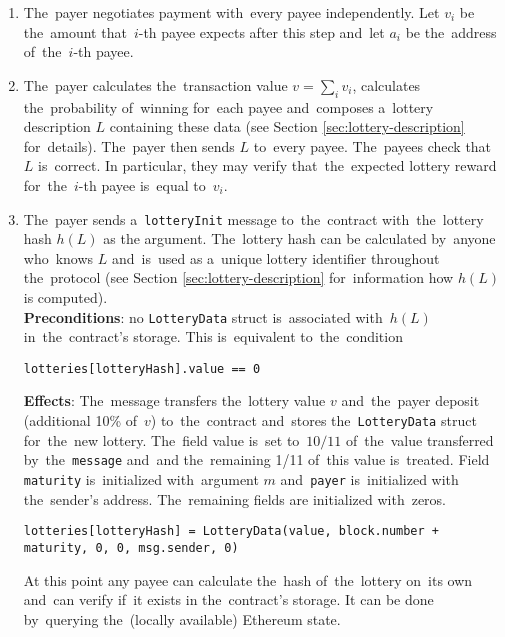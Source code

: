 \documentclass[a4paper]{article}
\begin{document}
    \begin{enumerate}
        \item The~payer negotiates payment with~every payee independently. Let $v_i$ be the~amount that~$i$-th payee
            expects after this step and~let $a_i$ be the~address of~the~$i$-th payee.
        \item The~payer calculates the~transaction value $v = \sum_i v_i$, calculates the~probability of~winning
            for~each payee and~composes a~lottery description $L$ containing these data (see Section
            \ref{sec:lottery-description} for~details). The~payer then sends $L$ to~every payee. The~payees check that~$L$
            is~correct. In particular, they may verify that~the~expected lottery reward for~the~$i$-th payee is~equal
            to~$v_i$.
        \item The~payer sends a~\texttt{lotteryInit} message to~the~contract with~the~lottery hash $h(L)$ as the
            argument. The~lottery hash can be calculated by~anyone who~knows $L$ and~is~used as a~unique lottery
            identifier throughout the~protocol (see Section \ref{sec:lottery-description} for~information how $h(L)$ is
            computed).\\
            \textbf{Preconditions}: no \texttt{LotteryData} struct is~associated with~$h(L)$ in~the~contract's
            storage. This is~equivalent to~the~condition
            \begin{center}
	            \texttt{lotteries[lotteryHash].value == 0}
	        \end{center}
            \textbf{Effects}: The~message transfers the~lottery value $v$ and~the~payer deposit (additional 10\%
            of~$v$) to~the~contract and~stores the~\texttt{LotteryData} struct for~the~new lottery. The~field value
            is~set to~$10/11$ of~the~value transferred by~the~\texttt{message} and~and the~remaining 1/11 of~this value
            is~treated. Field \texttt{maturity} is~initialized with~argument $m$ and~\texttt{payer} is~initialized with
            the~sender's address. The~remaining fields are initialized with~zeros.
            \begin{center}
            \texttt{lotteries[lotteryHash] = LotteryData(value, block.number + maturity, 0, 0, msg.sender, 0)}
            \end{center}
            At this point any payee can calculate the~hash of~the~lottery on~its own and~can verify if~it exists in
            the~contract's storage. It can be done by~querying the~(locally available) Ethereum state.

\end{enumerate}
\end{document}
